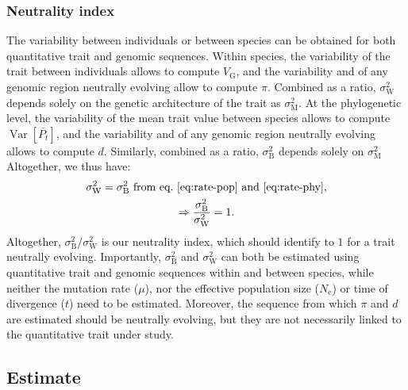 \documentclass{article}
\DeclareMathOperator{\Var}{\text{Var}}
\newcommand{\Ne}{N_{\text{e}}}
\newcommand{\Time}{t}
\newcommand{\Trait}{P}
\newcommand{\MeanTrait}{\bar{\Trait_{\Time}}}
\newcommand{\VarPhy}{\Var \left[\MeanTrait\right]}
\newcommand{\MutationRate}{\mu}
\newcommand{\VarGenetic}{V_{\mathrm{G}}}
\newcommand{\RateMut}{\sigma^2_{\mathrm{M}}}
\newcommand{\RateBetween}{\sigma^2_{\mathrm{B}}}
\newcommand{\RateWhithin}{\sigma^2_{\mathrm{W}}}
\begin{document}
\subsubsection*{Neutrality index}

The variability between individuals or between species can be obtained for both quantitative trait and genomic sequences.
Within species, the variability of the trait between individuals allows to compute $\VarGenetic$, and the variability and of any genomic region neutrally evolving allow to compute $\pi$.
Combined as a ratio, $\RateWhithin$ depends solely on the genetic architecture of the trait as $\RateMut$.
At the phylogenetic level, the variability of the mean trait value between species allows to compute $\VarPhy$, and the variability and of any genomic region neutrally evolving allows to compute $d$.
Similarly, combined as a ratio, $\RateBetween$ depends solely on $\RateMut$
Altogether, we thus have:
\begin{gather}
    \RateWhithin = \RateBetween \text{ from eq.~\ref{eq:rate-pop} and~\ref{eq:rate-phy}}, \\
    \Rightarrow \frac{\RateBetween}{\RateWhithin} = 1.
\end{gather}
Altogether, $\RateBetween / \RateWhithin$ is our neutrality index, which should identify to $1$ for a trait neutrally evolving.
Importantly, $\RateBetween$ and $\RateWhithin$ can both be estimated using quantitative trait and genomic sequences within and between species, while neither the mutation rate ($\MutationRate$), nor the effective population size ($\Ne$) or time of divergence ($\Time$) need to be estimated.
Moreover, the sequence from which $\pi$ and $d$ are estimated should be neutrally evolving, but they are not necessarily linked to the quantitative trait under study.

\subsection*{Estimate}\label{subsec:estimate}
\end{document}
